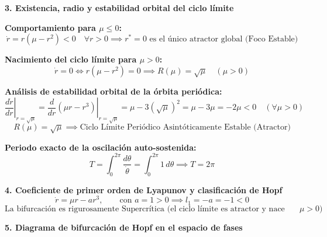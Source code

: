 \documentclass[11pt,a4paper]{article}
\newenvironment{solucion}[1][Solución Detallada]{%
    \vspace{1.5mm}%
    \noindent{\large\textbf{Solución:}}\par\vspace{1.5mm}%
}{%
    \par\vspace{3mm}%
}
\begin{document}
\begin{solucion}
\textbf{\large 3. Existencia, radio y estabilidad orbital del ciclo límite}

\textbf{Comportamiento para $\mu \le 0$:}
\[
\dot{r} = r(\mu - r^2) < 0 \quad \forall r > 0 \implies \boxed{r^* = 0 \text{ es el único atractor global (Foco Estable)}}
\]

\textbf{Nacimiento del ciclo límite para $\mu > 0$:}
\[
\dot{r} = 0 \iff r(\mu - r^2) = 0 \implies \boxed{R(\mu) = \sqrt{\mu} \quad (\mu > 0)}
\]

\textbf{Análisis de estabilidad orbital de la órbita periódica:}
\[
\left.\frac{d\dot{r}}{dr}\right|_{r = \sqrt{\mu}} = \left.\frac{d}{dr}(\mu r - r^3)\right|_{r = \sqrt{\mu}} = \mu - 3(\sqrt{\mu})^2 = \mu - 3\mu = -2\mu < 0 \quad (\forall \mu > 0)
\]
\[
\boxed{R(\mu) = \sqrt{\mu} \implies \text{Ciclo Límite Periódico Asintóticamente Estable (Atractor)}}
\]

\textbf{Periodo exacto de la oscilación auto-sostenida:}
\[
T = \int_0^{2\pi} \frac{d\theta}{\dot{\theta}} = \int_0^{2\pi} 1\, d\theta \implies \boxed{T = 2\pi}
\]

\vspace{3.5mm}

\textbf{\large 4. Coeficiente de primer orden de Lyapunov y clasificación de Hopf}
\[
\dot{r} = \mu r - a r^3, \qquad \text{con } a = 1 > 0 \implies \boxed{l_1 = -a = -1 < 0}
\]
\[
\boxed{\text{La bifurcación es rigurosamente Supercrítica (el ciclo límite es atractor y nace para } \mu > 0)}
\]

\vspace{3.5mm}

\textbf{\large 5. Diagrama de bifurcación de Hopf en el espacio de fases}

\begin{center}
\end{center}
\end{solucion}
\end{document}
